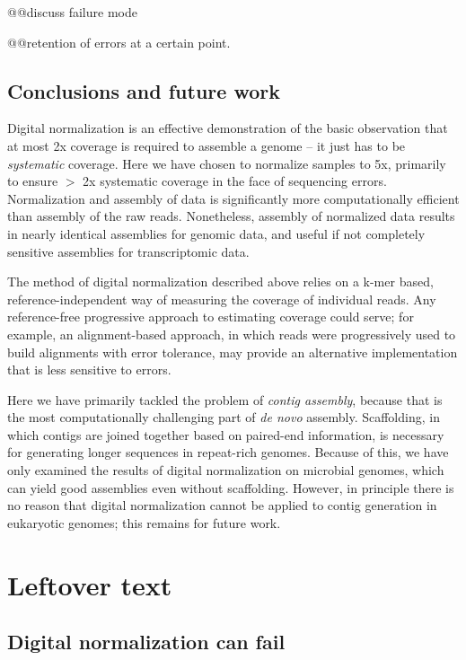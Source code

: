 \documentclass[10pt]{article}
\begin{document}
@@discuss failure mode

@@retention of errors at a certain point.

\subsection*{Conclusions and future work}

Digital normalization is an effective demonstration of the basic
observation that at most 2x coverage is required to assemble a genome
-- it just has to be {\em systematic} coverage.  Here we have chosen
to normalize samples to 5x, primarily to ensure $>$ 2x systematic
coverage in the face of sequencing errors.  Normalization and assembly
of data is significantly more computationally efficient than assembly
of the raw reads.  Nonetheless, assembly of normalized data results in
nearly identical assemblies for genomic data, and useful if not
completely sensitive assemblies for transcriptomic data.

The method of digital normalization described above relies on a k-mer
based, reference-independent way of measuring the coverage of
individual reads.  Any reference-free progressive approach to
estimating coverage could serve; for example, an alignment-based
approach, in which reads were progressively used to build alignments
with error tolerance, may provide an alternative implementation that
is less sensitive to errors.

Here we have primarily tackled the problem of {\em contig assembly},
because that is the most computationally challenging part of {\em de
  novo} assembly.  Scaffolding, in which contigs are joined together
based on paired-end information, is necessary for generating longer
sequences in repeat-rich genomes.  Because of this, we have only
examined the results of digital normalization on microbial genomes,
which can yield good assemblies even without scaffolding.  However, in
principle there is no reason that digital normalization cannot be
applied to contig generation in eukaryotic genomes; this remains for
future work.

\section*{Leftover text}

\subsection*{Digital normalization can fail}
\end{document}
